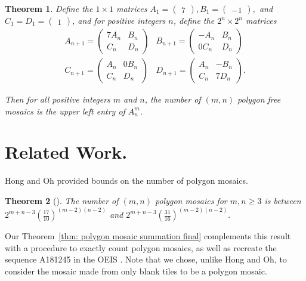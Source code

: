 \documentclass[12pt]{article}
\theoremstyle{plain}
\newtheorem{thm}{Theorem}[section]
\theoremstyle{remark}
\theoremstyle{definition}
\theoremstyle{remark}
\theoremstyle{definition}
\begin{document}
\begin{thm}
Define the $1 \times 1$ matrices $A_{1}=\begin{pmatrix}7\end{pmatrix}, B_{1}=\begin{pmatrix}-1\end{pmatrix},$ and $C_{1}=D_{1}=\begin{pmatrix}1\end{pmatrix}$, and for positive integers $n$, define the $2^{n} \times 2^{n}$ matrices
\begin{eqnarray*}
A_{n+1} = \begin{pmatrix} 7A_{n} & B_{n} \\ C_{n} & D_{n} \end{pmatrix} & B_{n+1} = \begin{pmatrix} -A_{n} & B_{n} \\ 0C_{n} & D_{n} \end{pmatrix} \\
C_{n+1} = \begin{pmatrix} A_{n} & 0B_{n} \\ C_{n} & D_{n} \end{pmatrix} & D_{n+1} = \begin{pmatrix} A_{n} & -B_{n} \\ C_{n} & 7D_{n} \end{pmatrix}.
\end{eqnarray*}

\noindent Then for all positive integers $m$ and $n$, the number of $(m,n)$ polygon free mosaics is the upper left entry of $A_{n}^m$.
\label{thm: messy mosaics}
\end{thm}

\section{Related Work.}\label{section: related work}

Hong and Oh \cite{Hong2018} provided bounds on the number of polygon mosaics.

\begin{thm}[\cite{Hong2018}]
\label{thm:Hong2018}
The number of $(m,n)$ polygon mosaics for $m,n \geq 3$ is between \\
$2^{m+n-3}\left(\frac{17}{10}\right)^{(m-2)(n-2)}$ and $2^{m+n-3}\left(\frac{31}{16}\right)^{(m-2)(n-2)}.$
\end{thm}

\noindent Our Theorem~\ref{thm: polygon mosaic summation final} complements this result with a procedure to exactly count polygon mosaics, as well as recreate the sequence A181245 in the OEIS \cite{oeis}. Note that we chose, unlike Hong and Oh, to consider the mosaic made from only blank tiles to be a polygon mosaic. 
\end{document}
